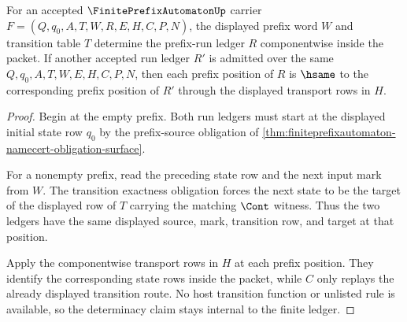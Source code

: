 \begin{theorem}
\label{thm:finiteprefixautomaton-prefix-run-determinacy}
For an accepted $\FinitePrefixAutomatonUp$ carrier $F=(Q,q_0,A,T,W,R,E,H,C,P,N)$, the displayed prefix word $W$ and transition table $T$ determine the prefix-run ledger $R$ componentwise inside the packet. If another accepted run ledger $R'$ is admitted over the same $Q,q_0,A,T,W,E,H,C,P,N$, then each prefix position of $R$ is $\hsame$ to the corresponding prefix position of $R'$ through the displayed transport rows in $H$.
\end{theorem}
\begin{proof}
Begin at the empty prefix. Both run ledgers must start at the displayed initial state row $q_0$ by the prefix-source obligation of \autoref{thm:finiteprefixautomaton-namecert-obligation-surface}.

For a nonempty prefix, read the preceding state row and the next input mark from $W$. The transition exactness obligation forces the next state to be the target of the displayed row of $T$ carrying the matching $\Cont$ witness. Thus the two ledgers have the same displayed source, mark, transition row, and target at that position.

Apply the componentwise transport rows in $H$ at each prefix position. They identify the corresponding state rows inside the packet, while $C$ only replays the already displayed transition route. No host transition function or unlisted rule is available, so the determinacy claim stays internal to the finite ledger.
\end{proof}


